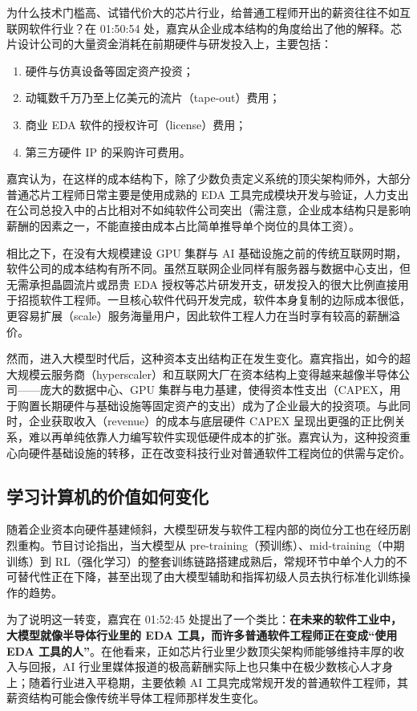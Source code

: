 \documentclass[UTF8,a4paper,11pt,fontset=fandol]{ctexart}
\begin{document}
为什么技术门槛高、试错代价大的芯片行业，给普通工程师开出的薪资往往不如互联网软件行业？在 01:50:54 处，嘉宾从企业成本结构的角度给出了他的解释。芯片设计公司的大量资金消耗在前期硬件与研发投入上，主要包括：
\begin{enumerate}
\item 硬件与仿真设备等固定资产投资；
\item 动辄数千万乃至上亿美元的流片（tape-out）费用；
\item 商业 EDA 软件的授权许可（license）费用；
\item 第三方硬件 IP 的采购许可费用。
\end{enumerate}
嘉宾认为，在这样的成本结构下，除了少数负责定义系统的顶尖架构师外，大部分普通芯片工程师日常主要是使用成熟的 EDA 工具完成模块开发与验证，人力支出在公司总投入中的占比相对不如纯软件公司突出（需注意，企业成本结构只是影响薪酬的因素之一，不能直接由成本占比简单推导单个岗位的具体工资）。

相比之下，在没有大规模建设 GPU 集群与 AI 基础设施之前的传统互联网时期，软件公司的成本结构有所不同。虽然互联网企业同样有服务器与数据中心支出，但无需承担晶圆流片或昂贵 EDA 授权等芯片研发开支，研发投入的很大比例直接用于招揽软件工程师。一旦核心软件代码开发完成，软件本身复制的边际成本很低，更容易扩展（scale）服务海量用户，因此软件工程人力在当时享有较高的薪酬溢价。

然而，进入大模型时代后，这种资本支出结构正在发生变化。嘉宾指出，如今的超大规模云服务商（hyperscaler）和互联网大厂在资本结构上变得越来越像半导体公司——庞大的数据中心、GPU 集群与电力基建，使得资本性支出（CAPEX，用于购置长期硬件与基础设施等固定资产的支出）成为了企业最大的投资项。与此同时，企业获取收入（revenue）的成本与底层硬件 CAPEX 呈现出更强的正比例关系，难以再单纯依靠人力编写软件实现低硬件成本的扩张。嘉宾认为，这种投资重心向硬件基础设施的转移，正在改变科技行业对普通软件工程岗位的供需与定价。

\subsection{学习计算机的价值如何变化}
随着企业资本向硬件基建倾斜，大模型研发与软件工程内部的岗位分工也在经历剧烈重构。节目讨论指出，当大模型从 pre-training（预训练）、mid-training（中期训练）到 RL（强化学习）的整套训练链路搭建成熟后，常规环节中单个人力的不可替代性正在下降，甚至出现了由大模型辅助和指挥初级人员去执行标准化训练操作的趋势。

为了说明这一转变，嘉宾在 01:52:45 处提出了一个类比：\textbf{在未来的软件工业中，大模型就像半导体行业里的 EDA 工具，而许多普通软件工程师正在变成“使用 EDA 工具的人”}。在他看来，正如芯片行业里少数顶尖架构师能够维持丰厚的收入与回报，AI 行业里媒体报道的极高薪酬实际上也只集中在极少数核心人才身上；随着行业进入平稳期，主要依赖 AI 工具完成常规开发的普通软件工程师，其薪资结构可能会像传统半导体工程师那样发生变化。
\end{document}
